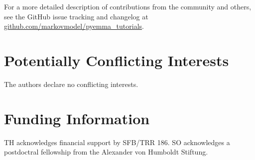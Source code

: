 \documentclass[9pt,tutorial]{livecoms}
\newcommand{\githubrepository}{\url{github.com/markovmodel/pyemma_tutorials}}
\begin{document}
For a more detailed description of contributions from the community and others, see the GitHub issue tracking and changelog at \githubrepository{}.

\section{Potentially Conflicting Interests}
The authors declare no conflicting interests.

\section{Funding Information}
TH acknowledges financial support by SFB/TRR 186. SO acknowledges a postdoctral fellowship from the Alexander von Humboldt Stiftung.




\end{document}
